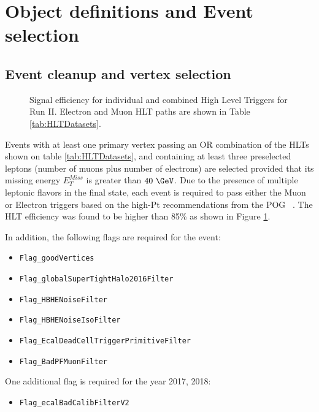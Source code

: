 \section{Object definitions and Event selection}

\subsection{Event cleanup and vertex selection}

\begin{figure}[tph]
  \centering
  \vfil
  \caption{Signal efficiency for individual and combined High Level Triggers for Run II. Electron and
    Muon HLT paths are shown in Table \ref{tab:HLTDatasets}.
  }
  \label{fig:hltSignalEfficiency}
\end{figure}


Events with at least one primary vertex passing an OR combination
of the HLTs shown on table \ref{tab:HLTDatasets}, and containing at least three
preselected leptons (number of muons plus number of electrons) are selected
provided that its missing energy $E_T^{Miss}$ is greater than $40~\GeV$.
Due to the presence of multiple leptonic flavors in the final state, each event
is required to pass either the Muon or Electron triggers based on the high-Pt
recommendations from the POG ~\cite{MuonHLT,ElectronHLT}. The HLT efficiency was found to be higher
than 85\% as shown in Figure \ref{fig:hltSignalEfficiency}.

In addition, the following flags are required for the event:

\begin{itemize}
  \item \verb|Flag_goodVertices|
  \item \verb|Flag_globalSuperTightHalo2016Filter|
  \item \verb|Flag_HBHENoiseFilter|
  \item \verb|Flag_HBHENoiseIsoFilter|
  \item \verb|Flag_EcalDeadCellTriggerPrimitiveFilter|
  \item \verb|Flag_BadPFMuonFilter|
\end{itemize}

One additional flag is required for the year 2017, 2018:

\begin{itemize}
\item \verb|Flag_ecalBadCalibFilterV2|
\end{itemize}

